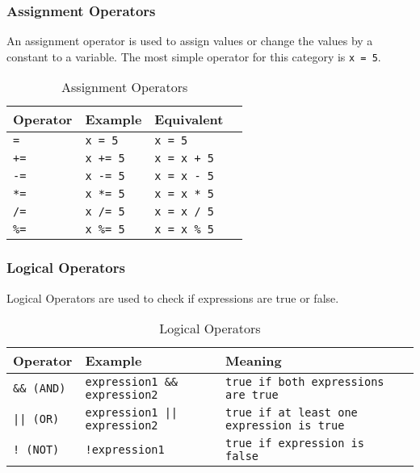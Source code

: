 \documentclass{report}
\begin{document}
\subsubsection{Assignment Operators}
An assignment operator is used to assign values or change the values by a constant to a variable. The most simple operator for this category is \lstinline{x = 5}.

\begin{table}[ht]
    \centering
    \begin{center}
    \begin{tabular}{llll}
        \toprule
        Operator & Example & Equivalent \\
        \midrule
        \texttt{=} & \texttt{x = 5} & \texttt{x = 5} \\
        \texttt{+=} & \texttt{x += 5}  & \texttt{x = x + 5} \\
        \texttt{-=} & \texttt{x -= 5}  & \texttt{x = x - 5} \\
        \texttt{*=} & \texttt{x *= 5}  & \texttt{x = x * 5} \\
        \texttt{/=} & \texttt{x /= 5}  & \texttt{x = x / 5} \\
        \texttt{\%=} & \texttt{x \%= 5}  & \texttt{x = x \% 5} \\
        \bottomrule
    \end{tabular}
    \end{center}
    \caption{Assignment Operators}
    \label{tab:data-types}
\end{table}

\subsubsection{Logical Operators}
Logical Operators are used to check if expressions are true or false.

\begin{table}[ht]
    \centering
    \begin{center}
    \begin{tabular}{llll}
        \toprule
        Operator & Example & Meaning \\
        \midrule
        \texttt{\&\& (AND)} & \texttt{expression1 \&\& expression2} & \texttt{true if both expressions are true} \\
        \texttt{|| (OR)} & \texttt{expression1 || expression2}  & \texttt{true if at least one expression is true} \\
        \texttt{! (NOT)} & \texttt{!expression1}  & \texttt{true if expression is false} \\
        \bottomrule
    \end{tabular}
    \end{center}
    \caption{Logical Operators}
    \label{tab:data-types}
\end{table}
\end{document}
